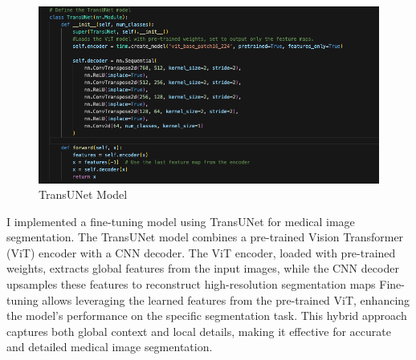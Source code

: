 \documentclass[11pt,a4paper]{article}
\begin{document}
\begin{figure}[H]
    \centering
    \includegraphics[width= 0.9\linewidth]{transUnet_imp.png}
    \caption{TransUNet Model}
    
\end{figure}
I implemented a fine-tuning model using TransUNet for medical image segmentation. The TransUNet model combines a pre-trained Vision Transformer (ViT) encoder with a CNN decoder. The ViT encoder, loaded with pre-trained weights, extracts global features from the input images, while the CNN decoder upsamples these features to reconstruct high-resolution segmentation maps
\vspace{0.2cm}
\linebreak
Fine-tuning allows leveraging the learned features from the pre-trained ViT, enhancing the model's performance on the specific segmentation task. This hybrid approach captures both global context and local details, making it effective for accurate and detailed medical image segmentation.
\vspace{0.6cm}
\end{document}
